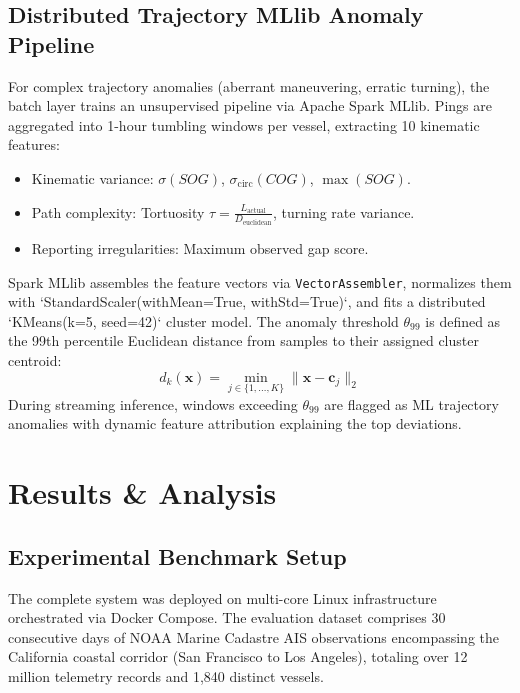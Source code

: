 \documentclass[10pt,twocolumn,a4paper]{article}
\begin{document}
\subsection{Distributed Trajectory MLlib Anomaly Pipeline}
For complex trajectory anomalies (aberrant maneuvering, erratic turning), the batch layer trains an unsupervised pipeline via Apache Spark MLlib. Pings are aggregated into 1-hour tumbling windows per vessel, extracting 10 kinematic features:
\begin{itemize}[leftmargin=*]
    \item Kinematic variance: $\sigma(SOG)$, $\sigma_{\text{circ}}(COG)$, $\max(SOG)$.
    \item Path complexity: Tortuosity $\tau = \frac{L_{\text{actual}}}{D_{\text{euclidean}}}$, turning rate variance.
    \item Reporting irregularities: Maximum observed gap score.
\end{itemize}

Spark MLlib assembles the feature vectors via \texttt{VectorAssembler}, normalizes them with `StandardScaler(withMean=True, withStd=True)`, and fits a distributed `KMeans(k=5, seed=42)` cluster model. The anomaly threshold $\theta_{99}$ is defined as the 99th percentile Euclidean distance from samples to their assigned cluster centroid:
\begin{equation}
    d_k(\mathbf{x}) = \min_{j \in \{1,\dots,K\}} \|\mathbf{x} - \mathbf{c}_j\|_2
\end{equation}
During streaming inference, windows exceeding $\theta_{99}$ are flagged as ML trajectory anomalies with dynamic feature attribution explaining the top deviations.

\section{Results \& Analysis}
\label{sec:results}

\subsection{Experimental Benchmark Setup}
The complete system was deployed on multi-core Linux infrastructure orchestrated via Docker Compose. The evaluation dataset comprises 30 consecutive days of NOAA Marine Cadastre AIS observations encompassing the California coastal corridor (San Francisco to Los Angeles), totaling over 12 million telemetry records and 1,840 distinct vessels.
\end{document}
